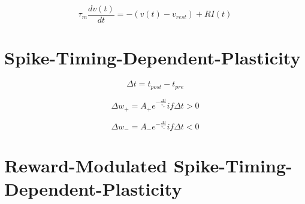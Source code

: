 

\begin{equation}
	\tau_m \frac{dv \left( t \right)}{dt} = - \left( v \left( t \right) - v_{rest} \right) + RI \left( t \right)
\end{equation}

\section{Spike-Timing-Dependent-Plasticity}

\begin{equation}
	\Delta t = t_{post} - t_{pre}
\end{equation}

\begin{equation}
	\Delta w_+ = A_+ e^{- \frac{\Delta t}{\tau_+}} if \Delta t > 0
\end{equation}

\begin{equation}
	\Delta w_- = A_- e^{- \frac{\Delta t}{\tau_-}} if \Delta t < 0
\end{equation}

\section{Reward-Modulated Spike-Timing-Dependent-Plasticity}
